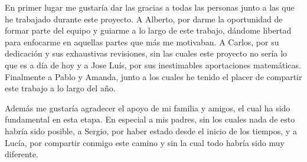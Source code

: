 En primer lugar me gustaría dar las gracias a todas las personas junto a las que
he trabajado durante este proyecto.
A Alberto, por darme la oportunidad de formar parte del equipo y
guiarme a lo largo de este trabajo, dándome libertad
para enfocarme en aquellas partes que más me motivaban. A Carlos, por su dedicación
y sus exhaustivas revisiones, sin las cuales este proyecto no sería lo que es
a día de hoy y a Jose Luís, por sus inestimables aportaciones
matemáticas. Finalmente a Pablo y Amanda, junto a los
cuales he tenido el placer de compartir este trabajo a lo largo del año.

Además me gustaría agradecer el apoyo de mi familia y amigos, el cual ha
sido fundamental en esta etapa. En especial a mis padres, sin los
cuales nada de esto habría sido posible, a Sergio, por haber estado
desde el inicio de los tiempos, y a Lucía, por compartir conmigo este
camino y sin la cual todo habría sido muy diferente.
